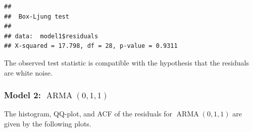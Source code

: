 \documentclass[
]{article}
\newenvironment{Shaded}{\begin{snugshade}}{\end{snugshade}}
\newcommand{\AttributeTok}[1]{\textcolor[rgb]{0.13,0.29,0.53}{#1}}
\newcommand{\DecValTok}[1]{\textcolor[rgb]{0.00,0.00,0.81}{#1}}
\newcommand{\FunctionTok}[1]{\textcolor[rgb]{0.13,0.29,0.53}{\textbf{#1}}}
\newcommand{\NormalTok}[1]{#1}
\newcommand{\OtherTok}[1]{\textcolor[rgb]{0.56,0.35,0.01}{#1}}
\newcommand{\SpecialCharTok}[1]{\textcolor[rgb]{0.81,0.36,0.00}{\textbf{#1}}}
\newcommand{\StringTok}[1]{\textcolor[rgb]{0.31,0.60,0.02}{#1}}
\begin{document}
\begin{Shaded}
\end{Shaded}

\begin{verbatim}
## 
##  Box-Ljung test
## 
## data:  model1$residuals
## X-squared = 17.798, df = 28, p-value = 0.9311
\end{verbatim}

The observed test statistic is compatible with the hypothesis that the
residuals are white noise.

\hypertarget{model-2-operatornamearma011}{%
\subsubsection{\texorpdfstring{Model 2:
\(\operatorname{ARMA}(0,1,1)\)}{Model 2: \textbackslash operatorname\{ARMA\}(0,1,1)}}\label{model-2-operatornamearma011}}

The histogram, QQ-plot, and ACF of the residuals for
\(\operatorname{ARMA}(0,1,1)\) are given by the following plots.

\begin{Shaded}
\end{Shaded}
\end{document}
